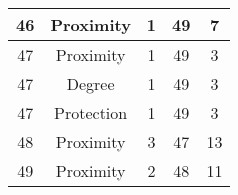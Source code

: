 \documentclass[results.tex]{subfiles}
\begin{document}
\begin{center}
\begin{tabular}{| c || c | c | c | c |}
            \hline
            46                      & Proximity                    & 1                      & 49                      & 7                    \\
            \hline
            47                      & Proximity                    & 1                      & 49                      & 3                    \\
            \hline
            47                      & Degree                       & 1                      & 49                      & 3                    \\
            \hline
            47                      & Protection                   & 1                      & 49                      & 3                    \\
            \hline
            48                      & Proximity                    & 3                      & 47                      & 13                   \\
            \hline
            49                      & Proximity                    & 2                      & 48                      & 11                   \\
            \hline
        \end{tabular}
    \end{center}
\end{document}
